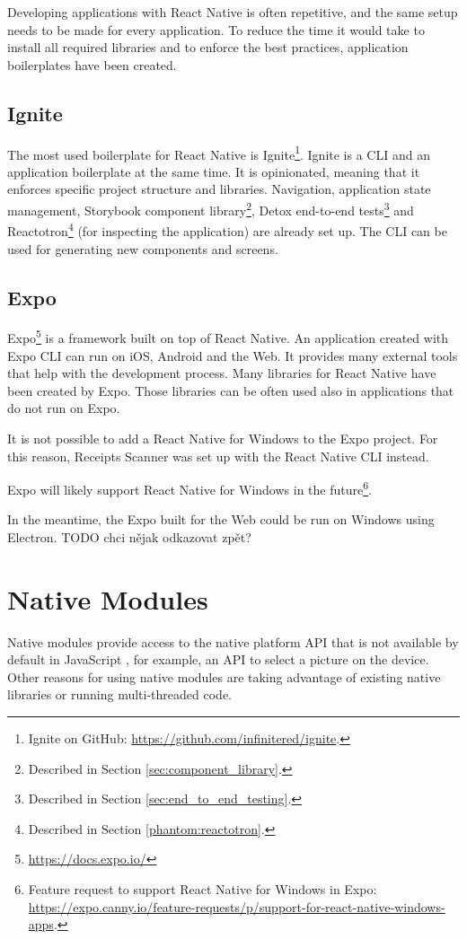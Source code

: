 \documentclass[
  digital, %
  table,   %
  oneside, %
  lof,     %
  lot,     %
]{fithesis3}
\begin{document}
Developing applications with React Native is often repetitive, and the same setup needs to be made for every application. To reduce the time it would take to install all required libraries and to enforce the best practices, application boilerplates have been created.

\subsection{Ignite}
The most used boilerplate for React Native is Ignite\footnote{Ignite on GitHub: \url{https://github.com/infinitered/ignite}.}.
Ignite is a CLI and an application boilerplate at the same time. It is opinionated, meaning that it enforces specific project structure and libraries. Navigation, application state management, Storybook component library\footnote{Described in Section \ref{sec:component_library}.}, Detox end-to-end tests\footnote{Described in Section \ref{sec:end_to_end_testing}.} and Reactotron\footnote{Described in Section \ref{phantom:reactotron}.} (for inspecting the application) are already set up. The CLI can be used for generating new components and screens.

\subsection{Expo}
Expo\footnote{\url{https://docs.expo.io/}} is a framework built on top of React Native. An application created with Expo CLI can run on iOS, Android and the Web. It provides many external tools that help with the development process. 
Many libraries for React Native have been created by Expo. Those libraries can be often used also in applications that do not run on Expo.

It is not possible to add a React Native for Windows to the Expo project. For this reason, Receipts Scanner was set up with the React Native CLI instead.

Expo will likely support React Native for Windows in the future\footnote{Feature request to support React Native for Windows in Expo: \url{https://expo.canny.io/feature-requests/p/support-for-react-native-windows-apps}.}.

In the meantime, the Expo built for the Web could be run on Windows using Electron. TODO chci nějak odkazovat zpět?

\section{Native Modules}
Native modules provide access to the native platform API that is not available by default in JavaScript \cite{RNNativeModulesIntro}, for example, an API to select a picture on the device. Other reasons for using native modules are taking advantage of existing native libraries or running multi-threaded code.
\end{document}
